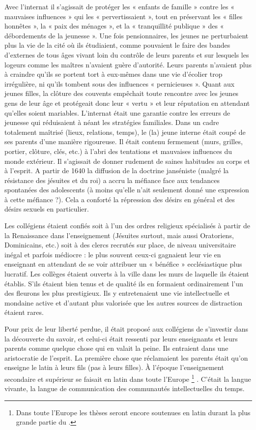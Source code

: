  Avec l'internat il s'agissait de protéger les « enfants de famille » contre les « mauvaises influences » qui les « pervertissaient », tout en préservant les « filles honnêtes », la « paix des ménages », et la « tranquillité publique » des « débordements de la jeunesse ». Une fois pensionnaires, les jeunes ne perturbaient plus la vie de la cité où ils étudiaient, comme pouvaient le faire des bandes d'externes de tous âges vivant loin du contrôle de leurs parents et sur lesquels les logeurs comme les maîtres n'avaient guère d'autorité. Leurs parents n'avaient plus à craindre qu'ils se portent tort à eux-mêmes dans une vie d'écolier trop irrégulière, ni qu'ils tombent sous des influences « pernicieuses ». Quant aux jeunes filles, la clôture des couvents empêchait toute rencontre avec les jeunes gens de leur âge et protégeait donc leur « vertu » et leur réputation en attendant qu'elles soient mariables. L'internat était une garantie contre les erreurs de jeunesse qui réduisaient à néant les stratégies familiales. Dans un cadre totalement maîtrisé (lieux, relations, temps), le (la) jeune interne était coupé de ses parents d'une manière rigoureuse. Il était contenu fermement (murs, grilles, portier, clôture, clés, etc.) à l'abri des tentations et mauvaises influences du monde extérieur. Il s'agissait de donner rudement de saines habitudes au corps et à l'esprit. A partir de 1640 la diffusion de la doctrine janséniste (malgré la résistance des jésuites et du roi) a accru la méfiance face aux tendances spontanées des adolescents (à moins qu'elle n'ait seulement donné une expression à cette méfiance ?). Cela a conforté la répression des désirs en général et des désirs sexuels en particulier.
 

Les collégiens étaient confiés soit à l'un des ordres religieux spécialisés à partir de la Renaissance dans l'enseignement (Jésuites surtout, mais aussi Oratoriens, Dominicains, etc.) soit à des clercs recrutés sur place, de niveau universitaire inégal et parfois médiocre : le plus souvent ceux-ci gagnaient leur vie en enseignant en attendant de se voir attribuer un « bénéfice » ecclésiastique plus lucratif. Les collèges étaient ouverts à la ville dans les murs de laquelle ils étaient établis. S'ils étaient bien tenus et de qualité ils en formaient ordinairement l'un des fleurons les plus prestigieux. Ils y entretenaient une vie intellectuelle et mondaine active et d'autant plus valorisée que les autres sources de distraction étaient rares. 

 Pour prix de leur liberté perdue, il était proposé aux collégiens de s'investir dans la découverte du savoir, et celui-ci était ressenti par leurs enseignants et leurs parents comme quelque chose qui en valait la peine. Ils entraient dans une aristocratie de l'esprit. La première chose que réclamaient les parents était qu'on enseigne le latin à leurs fils (pas à leurs filles). À l'époque l'enseignement secondaire et supérieur se faisait en latin dans toute l'Europe%
\footnote{Dans toute l'Europe les thèses seront encore soutenues en latin durant la plus grande partie du .}%
. C'était la langue vivante, la langue de communication des communautés intellectuelles du temps. 

